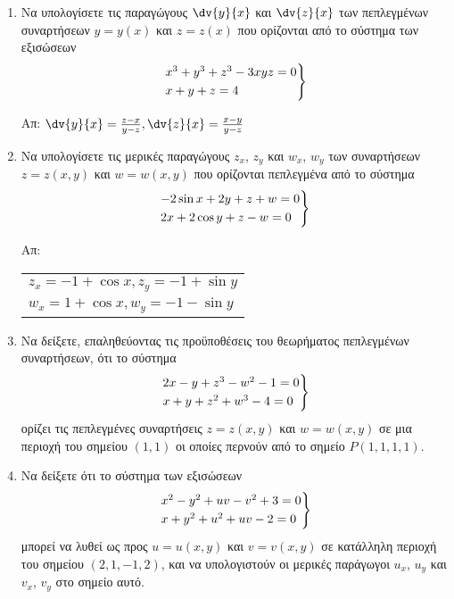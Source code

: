 \begin{enumerate}


  \item Να υπολογίσετε τις παραγώγους $ \dv{y}{x} $ και $ \dv{z}{x}$ των πεπλεγμένων 
    συναρτήσεων $ y=y(x) $ και $ z=z(x) $ που ορίζονται από το σύστημα των εξισώσεων
    \[
      \begin{rcases}
        x^{3} + y^{3} + z^{3} -3xyz = 0 \\
        x+y+z=4 
      \end{rcases}
    \]

    \hfill Απ: $ \dv{y}{x} = \frac{ z-x }{ y-z }, \dv{z}{x} = \frac{ x-y }{ y-z } $ 

  \item Να υπολογίσετε τις μερικές παραγώγους $ z_{x}$, $ z_{y} $ και $ w_{x} $, 
    $ w_{y} $ των συναρτήσεων $ z = z(x,y) $ και $ w = w(x,y) $ που ορίζονται 
    πεπλεγμένα από το σύστημα 
    \[
      \begin{rcases}
        -2 \sin{x} + 2y + z + w = 0  \\
        2x + 2 \cos{y} + z - w = 0 
      \end{rcases} 
    \]

    \hfill Απ: \begin{tabular}{l}
      $ z_{x} = -1 + \cos{x}, z_{y} = -1 + \sin{y} $ \\
      $ w_{x} = 1 + \cos{x}, w_{y} = -1 - \sin{y}  $ 
    \end{tabular}

  \item Να δείξετε, επαληθεύοντας τις προϋποθέσεις του θεωρήματος πεπλεγμένων
    συναρτήσεων, ότι το σύστημα 
    \[
      \begin{rcases}
        2x-y+z^{3}-w^{2}-1=0 \\
        x+y+z^{2}+w^{3}-4=0
      \end{rcases} 
    \]
    ορίζει τις πεπλεγμένες συναρτήσεις $ z = z(x,y) $ και $ w = w(x,y) $
    σε μια περιοχή του σημείου $ (1,1) $ οι οποίες περνούν από 
    το σημείο $ P(1,1,1,1) $.

  \item Να δείξετε ότι το σύστημα των εξισώσεων 
    \[
      \begin{rcases}
        x^{2}-y^{2}+uv-v^{2}+3 = 0 \\
        x+y^{2}+u^{2}+uv-2=0
      \end{rcases}
    \]
    μπορεί να λυθεί ως προς $ u = u(x,y) $ και $ v=v(x,y) $ σε κατάλληλη 
    περιοχή του σημείου $ (2,1,-1,2) $, και να υπολογιστούν οι μερικές παράγωγοι 
    $ u_{x} $, $ u_{y} $ και $ v_{x} $, $ v_{y} $ στο σημείο αυτό.


\end{enumerate}
